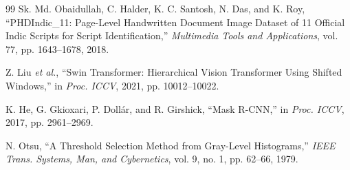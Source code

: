\documentclass[11pt]{article}
\begin{document}
\begin{thebibliography}{99}
 Sk. Md. Obaidullah, C. Halder, K. C. Santosh, N. Das, and K. Roy, ``PHDIndic\_11: Page-Level Handwritten Document Image Dataset of 11 Official Indic Scripts for Script Identification,'' \emph{Multimedia Tools and Applications}, vol. 77, pp. 1643--1678, 2018.

 Z. Liu \emph{et al.}, ``Swin Transformer: Hierarchical Vision Transformer Using Shifted Windows,'' in \emph{Proc. ICCV}, 2021, pp. 10012--10022.

 K. He, G. Gkioxari, P. Doll\'ar, and R. Girshick, ``Mask R-CNN,'' in \emph{Proc. ICCV}, 2017, pp. 2961--2969.

 N. Otsu, ``A Threshold Selection Method from Gray-Level Histograms,'' \emph{IEEE Trans. Systems, Man, and Cybernetics}, vol. 9, no. 1, pp. 62--66, 1979.

\end{thebibliography}
\end{document}
